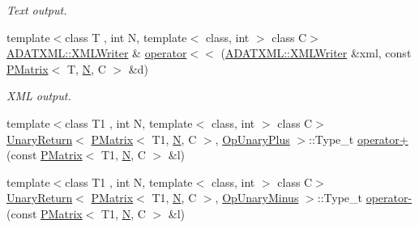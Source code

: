 \begin{DoxyCompactItemize}
\begin{DoxyCompactList}\small\item\em Text output. \end{DoxyCompactList}\item 
{\footnotesize template$<$class T , int N, template$<$ class, int $>$ class C$>$ }\\\mbox{\hyperlink{classADATXML_1_1XMLWriter}{A\+D\+A\+T\+X\+M\+L\+::\+X\+M\+L\+Writer}} \& \mbox{\hyperlink{group__primmatrix_ga88162a3095bbb5b40ba8100093befe2b}{operator$<$$<$}} (\mbox{\hyperlink{classADATXML_1_1XMLWriter}{A\+D\+A\+T\+X\+M\+L\+::\+X\+M\+L\+Writer}} \&xml, const \mbox{\hyperlink{classENSEM_1_1PMatrix}{P\+Matrix}}$<$ T, \mbox{\hyperlink{operator__name__util_8cc_a7722c8ecbb62d99aee7ce68b1752f337}{N}}, C $>$ \&d)
\begin{DoxyCompactList}\small\item\em X\+ML output. \end{DoxyCompactList}\item 
{\footnotesize template$<$class T1 , int N, template$<$ class, int $>$ class C$>$ }\\\mbox{\hyperlink{structENSEM_1_1UnaryReturn}{Unary\+Return}}$<$ \mbox{\hyperlink{classENSEM_1_1PMatrix}{P\+Matrix}}$<$ T1, \mbox{\hyperlink{operator__name__util_8cc_a7722c8ecbb62d99aee7ce68b1752f337}{N}}, C $>$, \mbox{\hyperlink{structENSEM_1_1OpUnaryPlus}{Op\+Unary\+Plus}} $>$\+::Type\+\_\+t \mbox{\hyperlink{group__primmatrix_ga0034bb2111966a353c20e6d171273d4e}{operator+}} (const \mbox{\hyperlink{classENSEM_1_1PMatrix}{P\+Matrix}}$<$ T1, \mbox{\hyperlink{operator__name__util_8cc_a7722c8ecbb62d99aee7ce68b1752f337}{N}}, C $>$ \&l)
\item 
{\footnotesize template$<$class T1 , int N, template$<$ class, int $>$ class C$>$ }\\\mbox{\hyperlink{structENSEM_1_1UnaryReturn}{Unary\+Return}}$<$ \mbox{\hyperlink{classENSEM_1_1PMatrix}{P\+Matrix}}$<$ T1, \mbox{\hyperlink{operator__name__util_8cc_a7722c8ecbb62d99aee7ce68b1752f337}{N}}, C $>$, \mbox{\hyperlink{structENSEM_1_1OpUnaryMinus}{Op\+Unary\+Minus}} $>$\+::Type\+\_\+t \mbox{\hyperlink{group__primmatrix_ga76960c32943a9f55860945f47f02de5b}{operator-\/}} (const \mbox{\hyperlink{classENSEM_1_1PMatrix}{P\+Matrix}}$<$ T1, \mbox{\hyperlink{operator__name__util_8cc_a7722c8ecbb62d99aee7ce68b1752f337}{N}}, C $>$ \&l)
\item 

\end{DoxyCompactItemize}
